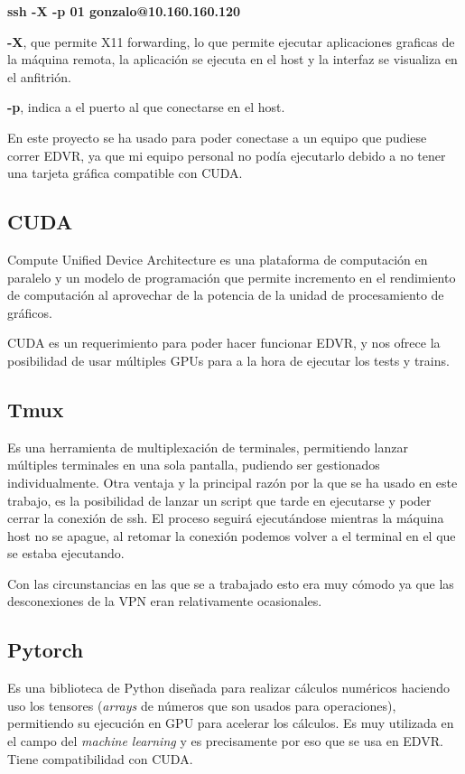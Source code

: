     \textbf {ssh -X -p 01 gonzalo@10.160.160.120}
    
    \textbf{-X}, que permite X11 forwarding, lo que permite ejecutar aplicaciones graficas de la máquina remota, la aplicación se ejecuta en el host y la interfaz se visualiza en el anfitrión.
    
    \textbf{-p},  indica a el puerto al que conectarse en el host.
    
   
    
    En este proyecto se ha usado para poder conectase a un equipo que pudiese correr EDVR, ya que mi equipo personal no podía ejecutarlo debido a no tener una tarjeta gráfica compatible con CUDA.
    
    \subsection{CUDA}
    Compute Unified Device Architecture es una plataforma de computación en paralelo y un modelo de programación que permite incremento en el rendimiento de computación al aprovechar de la potencia de la unidad de procesamiento de gráficos.
    
    CUDA es un requerimiento  para poder hacer funcionar EDVR, y nos ofrece la posibilidad de usar múltiples GPUs para a la hora de ejecutar los tests y trains.
    
    \subsection{Tmux}
    Es una herramienta de multiplexación de terminales, permitiendo lanzar múltiples terminales en una sola pantalla, pudiendo ser gestionados individualmente. Otra ventaja y la principal razón por la que se ha usado en este trabajo, es la posibilidad de lanzar un script que tarde en ejecutarse y poder cerrar la conexión de ssh. El proceso seguirá ejecutándose mientras la máquina host no se apague, al retomar la conexión podemos volver a el terminal en el que se estaba ejecutando.
    
    Con las circunstancias en las que se a trabajado esto era muy cómodo ya que las desconexiones de la VPN eran relativamente ocasionales.
    
    \subsection{Pytorch}
    Es una biblioteca de Python diseñada para realizar cálculos numéricos haciendo uso los tensores (\emph{arrays} de números que son usados para operaciones), permitiendo su ejecución en GPU para acelerar los cálculos. Es muy utilizada en el campo del \emph{machine learning} y es precisamente por eso que se usa en EDVR. Tiene compatibilidad con CUDA.


